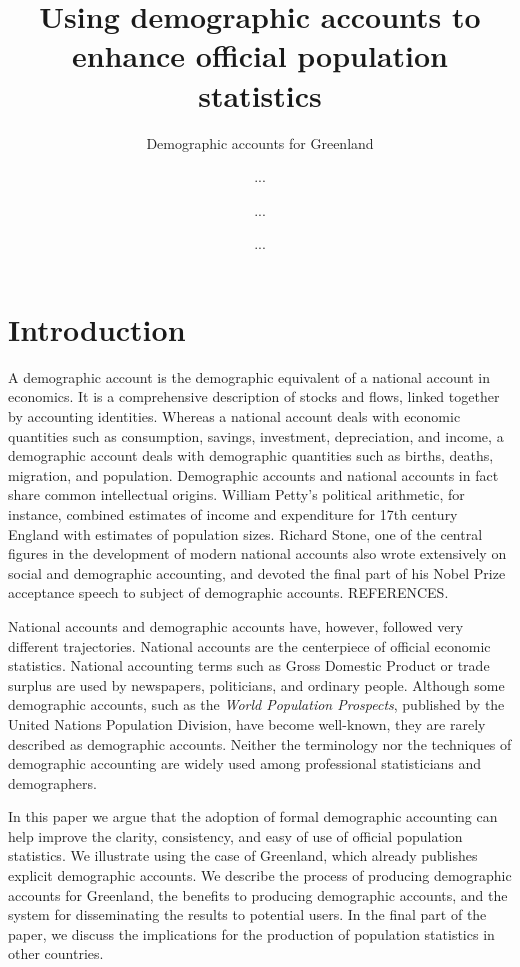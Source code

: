 \documentclass[USenglish]{article}
\begin{document}

  \author*[1]{...}
  \author[2]{...}
  \author[1]{...} 
  \title{ Using demographic accounts to enhance official population statistics  }
  \subtitle{Demographic accounts for Greenland}
  \aop

\maketitle



\section{Introduction} 

A demographic account is the demographic equivalent of a national account in economics. It is a comprehensive description of stocks and flows, linked together by accounting identities. Whereas a national account deals with economic quantities such as consumption, savings, investment, depreciation, and income, a demographic account deals with demographic quantities such as births, deaths, migration, and population. Demographic accounts and national accounts in fact share common intellectual origins. William Petty's political arithmetic, for instance, combined estimates of income and expenditure for 17th century England with estimates of population sizes. Richard Stone, one of the central figures in the development of modern national accounts also wrote extensively on social and demographic accounting, and devoted the final part of his Nobel Prize acceptance speech to subject of demographic accounts. REFERENCES.

National accounts and demographic accounts have, however, followed very different trajectories. National accounts are the centerpiece of official economic statistics. National accounting terms such as Gross Domestic Product or trade surplus are used by newspapers, politicians, and ordinary people. Although some demographic accounts, such as the \emph{World Population Prospects}, published by the United Nations Population Division, have become well-known, they are rarely described as demographic accounts. Neither the terminology nor the techniques of demographic accounting are widely used among professional statisticians and demographers.

In this paper we argue that the adoption of formal demographic accounting can help improve the clarity, consistency, and easy of use of official population statistics. We illustrate using the case of Greenland, which already publishes explicit demographic accounts. We describe the process of producing demographic accounts for Greenland, the benefits to producing demographic accounts, and the system for disseminating the results to potential users. In the final part of the paper, we discuss the implications for the production of population statistics in other countries.
\end{document}
